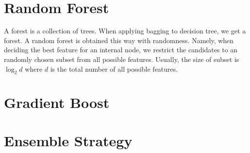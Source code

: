 \section{Random Forest}
A forest is a collection of trees. When applying bagging to decision tree, we get a forest. A random forest is
obtained this way with randomness. Namely, when deciding the best feature for an internal node, we restrict 
the candidates to an randomly chosen subset from all possible features. Usually, the size of subset is 
$\log_2 d$ where $d$ is the total number of all possible features.

\section{Gradient Boost}

\section{Ensemble Strategy}
